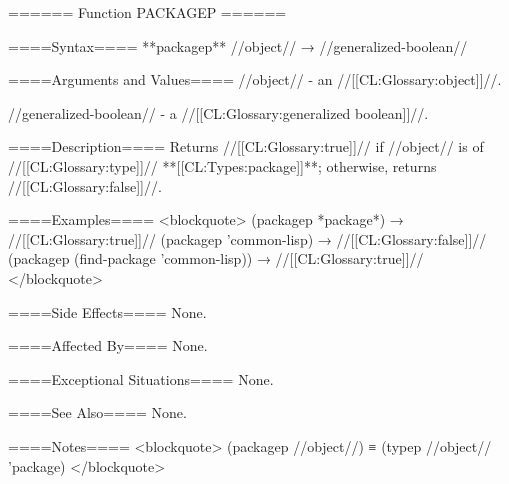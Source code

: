 ====== Function PACKAGEP ======

====Syntax====
**packagep** //object// → //generalized-boolean//

====Arguments and Values====
//object// - an //[[CL:Glossary:object]]//.

//generalized-boolean// - a //[[CL:Glossary:generalized boolean]]//.

====Description====
Returns //[[CL:Glossary:true]]// if //object// is of //[[CL:Glossary:type]]// **[[CL:Types:package]]**; otherwise, returns //[[CL:Glossary:false]]//.

====Examples==== <blockquote> (packagep *package*) → //[[CL:Glossary:true]]// (packagep 'common-lisp) → //[[CL:Glossary:false]]// (packagep (find-package 'common-lisp)) → //[[CL:Glossary:true]]// </blockquote>

====Side Effects====
None.

====Affected By====
None.

====Exceptional Situations====
None.

====See Also====
None.

====Notes====
<blockquote> (packagep //object//) ≡ (typep //object// 'package) </blockquote>

